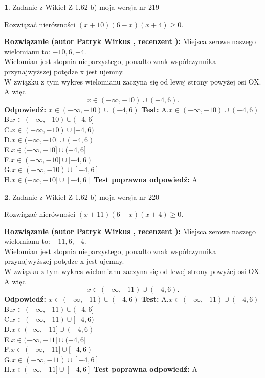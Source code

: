 \documentclass[12pt, a4paper]{article}
\theoremstyle{definition} %
\newtheorem{zad}{}
\newcommand{\zadStart}[1]{\begin{zad}#1\newline}
\newcommand{\zadStop}{\end{zad}}
\newcommand{\rozwStart}[2]{\noindent \textbf{Rozwiązanie (autor #1 , recenzent #2): }\newline}
\newcommand{\rozwStop}{\newline}
\newcommand{\odpStart}{\noindent \textbf{Odpowiedź:}\newline}
\newcommand{\odpStop}{\newline}
\newcommand{\testStart}{\noindent \textbf{Test:}\newline}
\newcommand{\testStop}{\newline}
\newcommand{\kluczStart}{\noindent \textbf{Test poprawna odpowiedź:}\newline}
\newcommand{\kluczStop}{\newline}
\begin{document}
\zadStart{Zadanie z Wikieł Z 1.62 b) moja wersja nr 219}

Rozwiązać nierówności $(x+10)(6-x)(x+4)\ge0$.
\zadStop
\rozwStart{Patryk Wirkus}{}
Miejsca zerowe naszego wielomianu to: $-10, 6, -4$.\\
Wielomian jest stopnia nieparzystego, ponadto znak współczynnika przy\linebreak najwyższej potędze x jest ujemny.\\ W związku z tym wykres wielomianu zaczyna się od lewej strony powyżej osi OX. A więc $$x \in (-\infty,-10) \cup (-4,6).$$
\rozwStop
\odpStart
$x \in (-\infty,-10) \cup (-4,6)$
\odpStop
\testStart
A.$x \in (-\infty,-10) \cup (-4,6)$\\
B.$x \in (-\infty,-10) \cup (-4,6]$\\
C.$x \in (-\infty,-10) \cup [-4,6)$\\
D.$x \in (-\infty,-10] \cup (-4,6)$\\
E.$x \in (-\infty,-10] \cup (-4,6]$\\
F.$x \in (-\infty,-10] \cup [-4,6)$\\
G.$x \in (-\infty,-10) \cup [-4,6]$\\
H.$x \in (-\infty,-10] \cup [-4,6]$
\testStop
\kluczStart
A
\kluczStop



\zadStart{Zadanie z Wikieł Z 1.62 b) moja wersja nr 220}

Rozwiązać nierówności $(x+11)(6-x)(x+4)\ge0$.
\zadStop
\rozwStart{Patryk Wirkus}{}
Miejsca zerowe naszego wielomianu to: $-11, 6, -4$.\\
Wielomian jest stopnia nieparzystego, ponadto znak współczynnika przy\linebreak najwyższej potędze x jest ujemny.\\ W związku z tym wykres wielomianu zaczyna się od lewej strony powyżej osi OX. A więc $$x \in (-\infty,-11) \cup (-4,6).$$
\rozwStop
\odpStart
$x \in (-\infty,-11) \cup (-4,6)$
\odpStop
\testStart
A.$x \in (-\infty,-11) \cup (-4,6)$\\
B.$x \in (-\infty,-11) \cup (-4,6]$\\
C.$x \in (-\infty,-11) \cup [-4,6)$\\
D.$x \in (-\infty,-11] \cup (-4,6)$\\
E.$x \in (-\infty,-11] \cup (-4,6]$\\
F.$x \in (-\infty,-11] \cup [-4,6)$\\
G.$x \in (-\infty,-11) \cup [-4,6]$\\
H.$x \in (-\infty,-11] \cup [-4,6]$
\testStop
\kluczStart
A
\kluczStop
\end{document}
